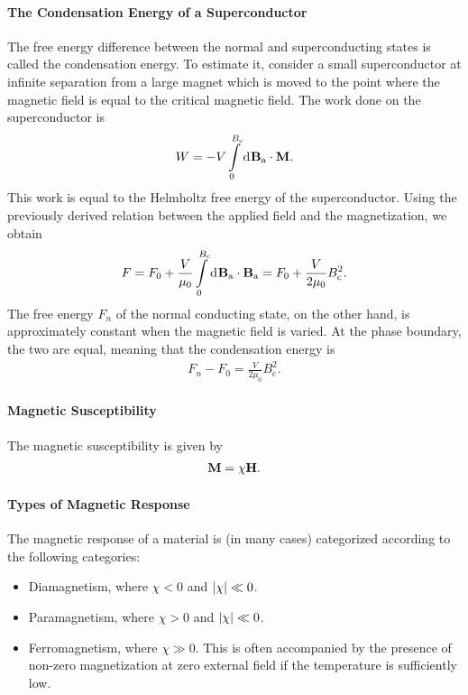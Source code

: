 \paragraph{The Condensation Energy of a Superconductor}
The free energy difference between the normal and superconducting states is called the condensation energy. To estimate it, consider a small superconductor at infinite separation from a large magnet which is moved to the point where the magnetic field is equal to the critical magnetic field. The work done on the superconductor is
\begin{align*}
	W = -V\int\limits_{0}^{B_{\text{c}}}\dd[]{\vb{B}_{\text{a}}}\cdot\vb{M}.
\end{align*}
This work is equal to the Helmholtz free energy of the superconductor. Using the previously derived relation between the applied field and the magnetization, we obtain
\begin{align*}
	F = F_{0} + \frac{V}{\mu_{0}}\int\limits_{0}^{B_{\text{c}}}\dd[]{\vb{B}_{\text{a}}}\cdot\vb{B}_{\text{a}} = F_{0} + \frac{V}{2\mu_{0}}B_{\text{c}}^{2}.
\end{align*}
The free energy $F_{n}$ of the normal conducting state, on the other hand, is approximately constant when the magnetic field is varied. At the phase boundary, the two are equal, meaning that the condensation energy is
\begin{align*}
	F_{n} - F_{0} = \frac{V}{2\mu_{0}}B_{\text{c}}^{2}.
\end{align*}

\paragraph{Magnetic Susceptibility}
The magnetic susceptibility is given by
\begin{align*}
	\vb{M} = \chi\vb{H}.
\end{align*}

\paragraph{Types of Magnetic Response}
The magnetic response of a material is (in many cases) categorized according to the following categories:
\begin{itemize}
	\item Diamagnetism, where $\chi < 0$ and $\abs{\chi} \ll 0$.
	\item Paramagnetism, where $\chi > 0$ and $\abs{\chi} \ll 0$.
	\item Ferromagnetism, where $\chi \gg 0$. This is often accompanied by the presence of non-zero magnetization at zero external field if the temperature is sufficiently low.
\end{itemize}

